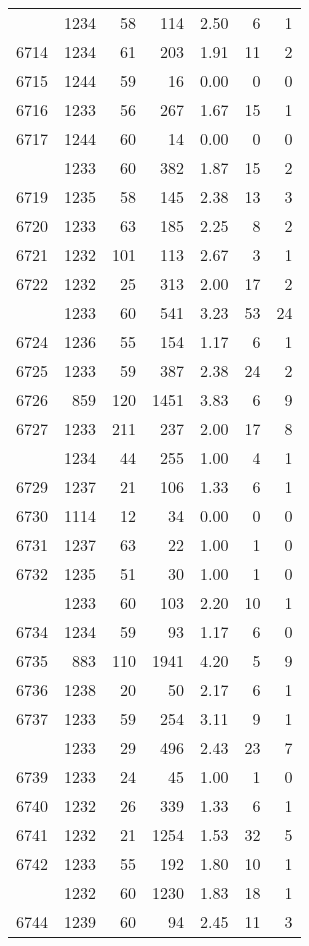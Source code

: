 \documentclass[
]{article}
\begin{document}
\begin{table}
\begin{tabular}[t]{lrrrrrr}
\addlinespace
6713 & 1234 & 58 & 114 & 2.50 & 6 & 1\\
6714 & 1234 & 61 & 203 & 1.91 & 11 & 2\\
6715 & 1244 & 59 & 16 & 0.00 & 0 & 0\\
6716 & 1233 & 56 & 267 & 1.67 & 15 & 1\\
6717 & 1244 & 60 & 14 & 0.00 & 0 & 0\\
\addlinespace
6718 & 1233 & 60 & 382 & 1.87 & 15 & 2\\
6719 & 1235 & 58 & 145 & 2.38 & 13 & 3\\
6720 & 1233 & 63 & 185 & 2.25 & 8 & 2\\
6721 & 1232 & 101 & 113 & 2.67 & 3 & 1\\
6722 & 1232 & 25 & 313 & 2.00 & 17 & 2\\
\addlinespace
6723 & 1233 & 60 & 541 & 3.23 & 53 & 24\\
6724 & 1236 & 55 & 154 & 1.17 & 6 & 1\\
6725 & 1233 & 59 & 387 & 2.38 & 24 & 2\\
6726 & 859 & 120 & 1451 & 3.83 & 6 & 9\\
6727 & 1233 & 211 & 237 & 2.00 & 17 & 8\\
\addlinespace
6728 & 1234 & 44 & 255 & 1.00 & 4 & 1\\
6729 & 1237 & 21 & 106 & 1.33 & 6 & 1\\
6730 & 1114 & 12 & 34 & 0.00 & 0 & 0\\
6731 & 1237 & 63 & 22 & 1.00 & 1 & 0\\
6732 & 1235 & 51 & 30 & 1.00 & 1 & 0\\
\addlinespace
6733 & 1233 & 60 & 103 & 2.20 & 10 & 1\\
6734 & 1234 & 59 & 93 & 1.17 & 6 & 0\\
6735 & 883 & 110 & 1941 & 4.20 & 5 & 9\\
6736 & 1238 & 20 & 50 & 2.17 & 6 & 1\\
6737 & 1233 & 59 & 254 & 3.11 & 9 & 1\\
\addlinespace
6738 & 1233 & 29 & 496 & 2.43 & 23 & 7\\
6739 & 1233 & 24 & 45 & 1.00 & 1 & 0\\
6740 & 1232 & 26 & 339 & 1.33 & 6 & 1\\
6741 & 1232 & 21 & 1254 & 1.53 & 32 & 5\\
6742 & 1233 & 55 & 192 & 1.80 & 10 & 1\\
\addlinespace
6743 & 1232 & 60 & 1230 & 1.83 & 18 & 1\\
6744 & 1239 & 60 & 94 & 2.45 & 11 & 3\\

\end{tabular}
\end{table}
\end{document}
